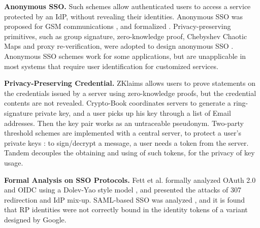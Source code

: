 \noindent\textbf{Anonymous SSO.}
Such schemes allow authenticated users to access a service protected by an IdP,
    without revealing their identities.
Anonymous SSO was proposed for GSM communications \cite{ElmuftiWRR08},
    and formalized \cite{WangWS13}.
Privacy-preserving primitives, such as group signature, zero-knowledge proof, Chebyshev Chaotic Maps and proxy re-verification,
     were adopted to design anonymous SSO \cite{WangWS13,HanCSTW18,Lee18,HanCSTWW20}.
Anonymous SSO schemes work for some applications,
    but are unapplicable in most systems that require user identification for customized services.

\noindent\textbf{Privacy-Preserving Credential.}
ZKlaims \cite{zklaim} allows users to prove statements on the credentials issued by a server
    using zero-knowledge proofs,
        but the credential contents are not revealed.
Crypto-Book \cite{crypto-book} coordinates servers to generate a ring-signature private key,
 and a user picks up his key through a list of Email addresses. %
 Then the key pair works as an untraceable pseudonym. %
Two-party threshold schemes are implemented with a central server,
    to protect a user's private keys \cite{mRSA,ss-rsa}:
    to sign/decrypt a message, a user needs a token from the server.
    Tandem \cite{tandem} decouples the obtaining and using of such tokens,
for the privacy of key usage.


\noindent\textbf{Formal Analysis on SSO Protocols.}
Fett et al. \cite{FettKS16, FettKS17} formally analyzed OAuth 2.0 and OIDC using a Dolev-Yao style model \cite{FettKS14},
    and presented the attacks of 307 redirection and IdP mix-up.
SAML-based SSO was analyzed \cite{ArmandoCCCT08},
    and it is found that RP identities were not correctly bound in the identity tokens of a variant designed by Google.



